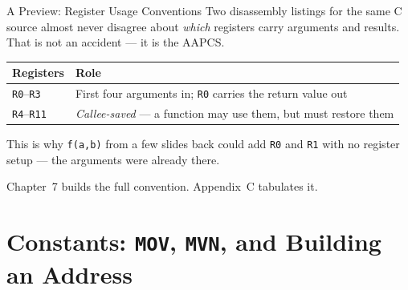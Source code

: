 \documentclass[9pt,aspectratio=169,xcolor=table]{beamer}
\newcommand{\striped}{\rowcolors{1}{white}{stripe}}
\begin{document}
\begin{frame}{A Preview: Register Usage Conventions}
    \leavevmode
    {\small Two disassembly listings for the same C source almost never
    disagree about \emph{which} registers carry arguments and results.
    That is not an accident --- it is the \alert{AAPCS}.}

    \vspace{2mm}
    \begin{center}
    {\small
    \striped
    \begin{tabular}{@{}l R{.6\textwidth}@{}}
        \toprule
        \textbf{Registers} & \textbf{Role} \\
        \midrule
        \texttt{R0}--\texttt{R3}  & First four arguments in; \texttt{R0} carries the return value out \\
        \texttt{R4}--\texttt{R11} & \emph{Callee-saved} --- a function may use them, but must restore them \\
        \bottomrule
    \end{tabular}}
    \end{center}

    \vspace{2mm}
    {\small This is why \texttt{f(a,b)} from a few slides back could add
    \texttt{R0} and \texttt{R1} with no register setup --- the arguments
    were already there.}

    \vspace{2mm}
    {\small Chapter~7 builds the full convention. Appendix~C tabulates it.}
\end{frame}

\section{Constants: \texttt{MOV}, \texttt{MVN}, and Building an Address}
\end{document}
